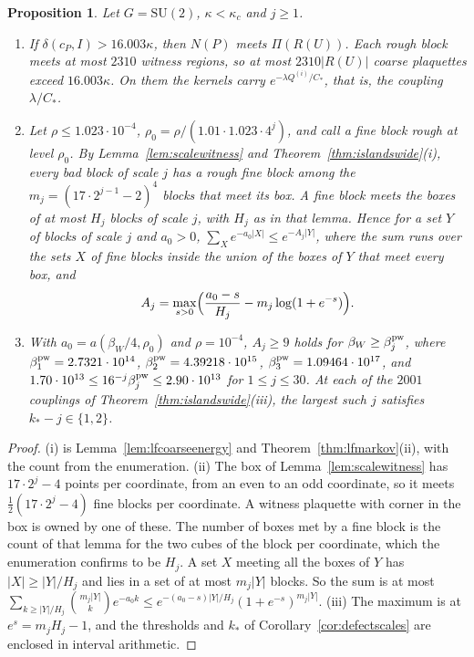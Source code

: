 \documentclass[11pt]{amsart}
\newtheorem{proposition}[theorem]{Proposition}
\theoremstyle{definition}
\theoremstyle{remark}
\numberwithin{equation}{section}
\newcommand{\SU}{\mathrm{SU}}
\begin{document}
\begin{proposition}\label{prop:lfinherited}
Let $G=\SU(2)$, $\kappa<\kappa_c$ and $j\ge1$.
\begin{enumerate}[label=\textup{(\roman*)},leftmargin=*]
\item If $\delta(c_P,I)>16.003\kappa$, then $N(P)$ meets $\Pi(R(U))$. Each
rough block meets at most $2310$ witness regions, so at most $2310|R(U)|$
coarse plaquettes exceed $16.003\kappa$. On them the kernels carry
$e^{-\lambda Q^{(i)}/C_*}$, that is, the coupling $\lambda/C_*$.
\item Let $\rho\le1.023\cdot10^{-4}$, $\rho_0=\rho/(1.01\cdot1.023\cdot4^j)$,
and call a fine block rough at level $\rho_0$. By
Lemma~\ref{lem:scalewitness} and Theorem~\ref{thm:islandswide}(i), every
bad block of scale $j$ has a rough fine block among the $m_j=(17\cdot2^{j-1}
-2)^4$ blocks that meet its box. A fine block meets the boxes of at most
$H_j$ blocks of scale $j$, with $H_j$ as in that lemma. Hence for a set
$Y$ of blocks of scale $j$ and $a_0>0$,
$\sum_Xe^{-a_0|X|}\le e^{-A_j|Y|}$, where the sum runs over the sets $X$
of fine blocks inside the union of the boxes of $Y$ that meet every box,
and
\[
A_j=\max_{s>0}\Bigl(\frac{a_0-s}{H_j}-m_j\log(1+e^{-s})\Bigr).
\]
\item With $a_0=a(\beta_W/4,\rho_0)$ and $\rho=10^{-4}$, $A_j\ge9$ holds for
$\beta_W\ge\beta^{\rm pw}_j$, where $\beta^{\rm pw}_1=2.7321\cdot10^{14}$,
$\beta^{\rm pw}_2=4.39218\cdot10^{15}$, $\beta^{\rm pw}_3=1.09464\cdot
10^{17}$, and $1.70\cdot10^{13}\le16^{-j}\beta^{\rm pw}_j\le2.90\cdot10^{13}$
for $1\le j\le30$. At each of the $2001$ couplings of
Theorem~\ref{thm:islandswide}(iii), the largest such $j$ satisfies
$k_*-j\in\{1,2\}$.
\end{enumerate}
\end{proposition}

\begin{proof}
(i) is Lemma~\ref{lem:lfcoarseenergy} and Theorem~\ref{thm:lfmarkov}(ii),
with the count from the enumeration. (ii) The box of
Lemma~\ref{lem:scalewitness} has $17\cdot2^j-4$ points per coordinate, from
an even to an odd coordinate, so it meets $\frac12(17\cdot2^j-4)$ fine
blocks per coordinate. A witness plaquette with corner in the box is owned
by one of these. The number of boxes met by a fine block is the count of
that lemma for the two cubes of the block per coordinate, which the
enumeration confirms to be $H_j$. A set $X$ meeting all the boxes of $Y$
has $|X|\ge|Y|/H_j$ and lies in a set of at most $m_j|Y|$ blocks. So the
sum is at most $\sum_{k\ge|Y|/H_j}\binom{m_j|Y|}ke^{-a_0k}\le e^{-(a_0-s)
|Y|/H_j}(1+e^{-s})^{m_j|Y|}$. (iii) The maximum is at $e^{s}=m_jH_j-1$, and
the thresholds and $k_*$ of Corollary~\ref{cor:defectscales} are enclosed
in interval arithmetic.
\end{proof}
\end{document}
